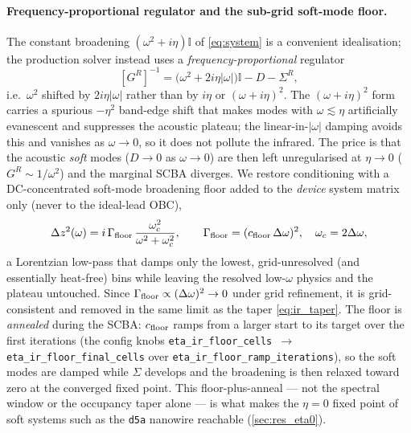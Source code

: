 \paragraph{Frequency-proportional regulator and the sub-grid soft-mode floor.}
The constant broadening $(\omega^2+i\eta)\mathbb{I}$ of \cref{eq:system} is a
convenient idealisation; the production solver instead uses a
\emph{frequency-proportional} regulator
\begin{equation}\label{eq:regulator_impl}
  [G^R]^{-1} = \bigl(\omega^2 + 2i\eta|\omega|\bigr)\mathbb{I} - D - \Sigma^R,
\end{equation}
i.e.\ $\omega^2$ shifted by $2i\eta|\omega|$ rather than by $i\eta$ or
$(\omega+i\eta)^2$. The $(\omega+i\eta)^2$ form carries a spurious $-\eta^2$
band-edge shift that makes modes with $\omega\lesssim\eta$ artificially evanescent
and suppresses the acoustic plateau; the linear-in-$|\omega|$ damping avoids this
and vanishes as $\omega\to0$, so it does not pollute the infrared. The price is
that the acoustic \emph{soft} modes ($D\to0$ as $\omega\to0$) are then left
unregularised at $\eta\to0$ ($G^R\sim1/\omega^2$) and the marginal SCBA diverges.
We restore conditioning with a DC-concentrated soft-mode broadening floor added to
the \emph{device} system matrix only (never to the ideal-lead OBC),
\begin{equation}\label{eq:eta_floor}
  \Delta z^2(\omega) = i\,\Gamma_{\rm floor}\,\frac{\omega_c^2}{\omega^2+\omega_c^2},
  \qquad \Gamma_{\rm floor}=(c_{\rm floor}\,\Delta\omega)^2,\quad
  \omega_c = 2\Delta\omega,
\end{equation}
a Lorentzian low-pass that damps only the lowest, grid-unresolved (and essentially
heat-free) bins while leaving the resolved low-$\omega$ physics and the plateau
untouched. Since $\Gamma_{\rm floor}\propto(\Delta\omega)^2\to0$ under grid
refinement, it is grid-consistent and removed in the same limit as the taper
\cref{eq:ir_taper}. The floor is \emph{annealed} during the SCBA: $c_{\rm floor}$
ramps from a larger start to its target over the first iterations
(the config knobs \texttt{eta\_ir\_floor\_cells}~$\to$~%
\texttt{eta\_ir\_floor\_final\_cells} over
\texttt{eta\_ir\_floor\_ramp\_iterations}), so the soft modes are damped while
$\Sigma$ develops and the broadening is then relaxed toward zero at the converged
fixed point. This floor-plus-anneal --- not the spectral window or the occupancy
taper alone --- is what makes the $\eta=0$ fixed point of soft systems such as the
\texttt{d5a} nanowire reachable (\cref{sec:res_eta0}).

